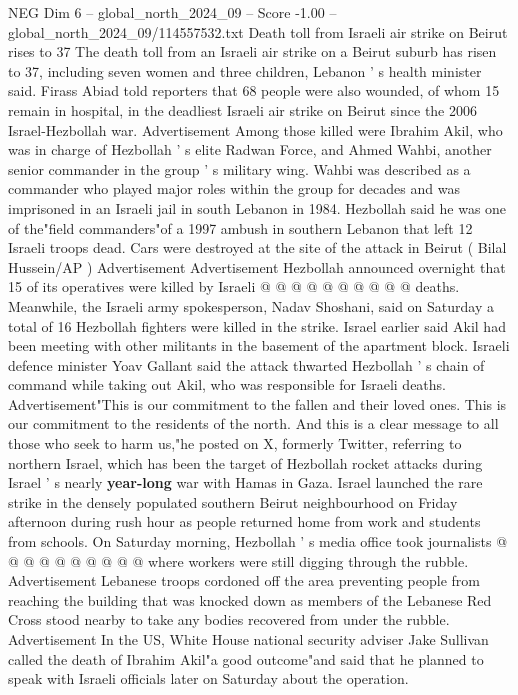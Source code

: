\begin{textsample}{NEG Dim 6 – global\_north\_2024\_09 – Score -1.00 – global\_north\_2024\_09/114557532.txt}  \label{ex:f6_neg_022}
Death toll from Israeli air strike on Beirut rises to 37 The death toll from an Israeli air strike on a Beirut suburb has risen to 37, including seven women and three children, Lebanon ' s health minister said.
Firass Abiad told reporters that 68 people were also wounded, of whom 15 remain in hospital, in the deadliest Israeli air strike on Beirut since the 2006 Israel-Hezbollah war.
Advertisement Among those killed were Ibrahim Akil, who was in charge of Hezbollah ' s elite Radwan Force, and Ahmed Wahbi, another senior commander in the group ' s military wing.
Wahbi was described as a commander who played major roles within the group for decades and was imprisoned in an Israeli jail in south Lebanon in 1984.
Hezbollah said he was one of the"field commanders"of a 1997 ambush in southern Lebanon that left 12 Israeli troops dead.
Cars were destroyed at the site of the attack in Beirut ( Bilal Hussein/AP ) Advertisement Advertisement Hezbollah announced overnight that 15 of its operatives were killed by Israeli @ @ @ @ @ @ @ @ @ @ deaths.
Meanwhile, the Israeli army spokesperson, Nadav Shoshani, said on Saturday a total of 16 Hezbollah fighters were killed in the strike.
Israel earlier said Akil had been meeting with other militants in the basement of the apartment block.
Israeli defence minister Yoav Gallant said the attack thwarted Hezbollah ' s chain of command while taking out Akil, who was responsible for Israeli deaths.
Advertisement"This is our commitment to the fallen and their loved ones.
This is our commitment to the residents of the north.
And this is a clear message to all those who seek to harm us,"he posted on X, formerly Twitter, referring to northern Israel, which has been the target of Hezbollah rocket attacks during Israel ' s nearly \textbf{year-long} war with Hamas in Gaza.
Israel launched the rare strike in the densely populated southern Beirut neighbourhood on Friday afternoon during rush hour as people returned home from work and students from schools.
On Saturday morning, Hezbollah ' s media office took journalists @ @ @ @ @ @ @ @ @ @ where workers were still digging through the rubble.
Advertisement Lebanese troops cordoned off the area preventing people from reaching the building that was knocked down as members of the Lebanese Red Cross stood nearby to take any bodies recovered from under the rubble.
Advertisement In the US, White House national security adviser Jake Sullivan called the death of Ibrahim Akil"a good outcome"and said that he planned to speak with Israeli officials later on Saturday about the operation.

\end{textsample}
